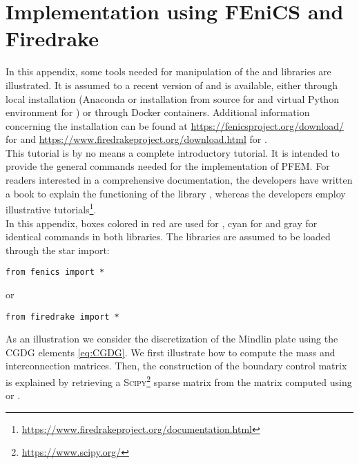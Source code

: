 \chapter{Implementation using FEniCS and Firedrake}

In this appendix, some tools needed for manipulation of the \fenics and \firedrake libraries are illustrated. It is assumed to a recent version of \fenics and \firedrake is available, either through local installation (Anaconda or installation from source for \fenics and virtual Python environment for \firedrake) or through Docker containers. Additional information concerning the installation can be found at \url{https://fenicsproject.org/download/} for \fenics and \url{https://www.firedrakeproject.org/download.html} for \firedrake. \\

This tutorial is by no means a complete introductory tutorial. It is intended to provide the general commands needed for the implementation of PFEM. For readers interested in a comprehensive documentation, the \fenics developers have written a book to explain the functioning of the library \cite{logg2012}, whereas the \firedrake developers employ illustrative tutorials\footnote{\url{https://www.firedrakeproject.org/documentation.html}}. \\

In this appendix, boxes colored in red are used for \textcolor{red}{\fenics}, cyan for \textcolor{cyan}{\firedrake} and gray for identical commands in both libraries. The libraries are assumed to be loaded through the star import:	
\begin{verbatim}
from fenics import *
\end{verbatim}
or
\begin{verbatim}
from firedrake import *
\end{verbatim}
As an illustration we consider the discretization of the Mindlin plate using the CGDG elements  \eqref{eq:CGDG}. We first illustrate how to compute the mass and interconnection matrices. Then, the construction of the boundary control matrix is explained by retrieving a \textsc{Scipy}\footnote{\url{https://www.scipy.org/}} sparse matrix from the matrix computed using \fenics or \firedrake.

